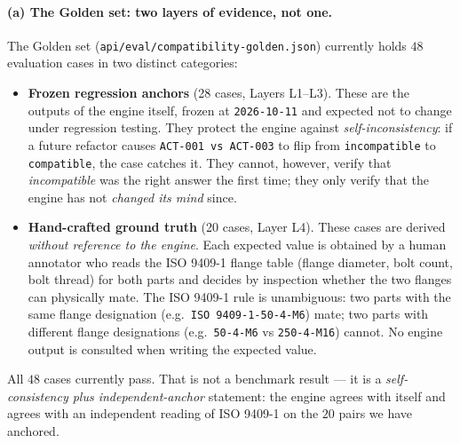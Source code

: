 \documentclass[review]{elsarticle}
\begin{document}
\paragraph{(a) The Golden set: two layers of evidence, not one.}
The Golden set (\texttt{api/eval/compatibility-golden.json})
currently holds $48$ evaluation cases in two distinct categories:

\begin{itemize}[nosep,leftmargin=*]
\item \textbf{Frozen regression anchors} (28 cases, Layers L1--L3).
These are the outputs of the engine itself, frozen at
\texttt{2026-10-11} and expected not to change under regression
testing. They protect the engine against \emph{self-inconsistency}:
if a future refactor causes \texttt{ACT-001 vs ACT-003} to flip from
\texttt{incompatible} to \texttt{compatible}, the case catches it.
They cannot, however, verify that \emph{incompatible} was the right
answer the first time; they only verify that the engine has not
\emph{changed its mind} since.
\item \textbf{Hand-crafted ground truth} (20 cases, Layer L4).
These cases are derived \emph{without reference to the engine}. Each
expected value is obtained by a human annotator who reads the ISO
9409-1 flange table (flange diameter, bolt count, bolt thread) for
both parts and decides by inspection whether the two flanges can
physically mate. The ISO 9409-1 rule is unambiguous: two parts with
the same flange designation (e.g.\ \texttt{ISO 9409-1-50-4-M6})
mate; two parts with different flange designations (e.g.\
\texttt{50-4-M6} vs \texttt{250-4-M16}) cannot. No engine output is
consulted when writing the expected value.
\end{itemize}

All $48$ cases currently pass. That is not a benchmark result --- it
is a \emph{self-consistency plus independent-anchor} statement: the
engine agrees with itself and agrees with an independent reading of
ISO 9409-1 on the $20$ pairs we have anchored.
\end{document}
